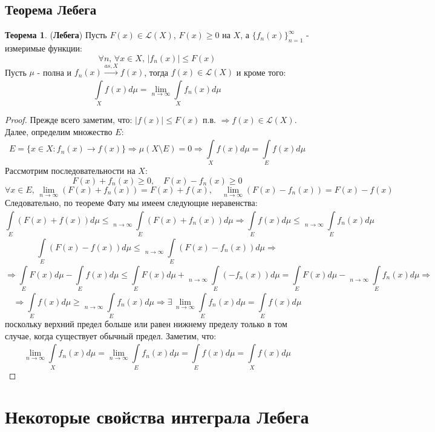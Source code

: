 \documentclass[12pt]{article}
\newcommand{\ML}{\mathcal{L}}
\theoremstyle{definition}
\newtheorem{theorem}{Теорема}
\newcommand{\ddint}[2]{\displaystyle\int\limits_{#1}^{#2}}
\DeclareMathOperator*\lowlim{\underline{lim}}
\DeclareMathOperator*\uplim{\overline{lim}}
\begin{document}
\subsection*{Теорема Лебега}
\begin{theorem}(\textbf{Лебега})
	Пусть $F(x) \in \ML(X)$, $F(x) \geq 0$ на $X$, а $\{f_n(x)\}_{n = 1}^{\infty}$ - измеримые функции:
	$$
		\forall n, \, \forall x \in X, \, |f_n(x)| \leq F(x)
	$$
	Пусть $\mu$ - полна и $f_n(x) \xrightarrow{as, X} f(x)$, тогда $f(x) \in \ML(X)$ и кроме того:
	$$
		\ddint{X}{}f(x)d\mu = \lim\limits_{n \to \infty}\ddint{X}{}f_n(x)d\mu
	$$
\end{theorem}
\begin{proof}
	Прежде всего заметим, что: $|f(x)| \leq F(x)$ п.в. $\Rightarrow f(x) \in \ML(X)$. Далее, определим множество $E$:
	$$
		E = \{x \in X \colon f_n(x) \to f(x)\} \Rightarrow \mu(X \setminus E) = 0 \Rightarrow \ddint{X}{}f(x)d\mu = \ddint{E}{}f(x)d\mu
	$$
	Рассмотрим последовательности на $X$:
	$$
		F(x) + f_n(x) \geq 0, \quad  F(x) - f_n(x) \geq 0 
	$$
	$$
		\forall x \in E,\, \lim\limits_{n \to \infty}(F(x) + f_n(x)) = F(x) + f(x), \quad \lim\limits_{n \to \infty}(F(x) - f_n(x)) = F(x) - f(x)
	$$
	Следовательно, по теореме Фату мы имеем следующие неравенства:
	$$
		\ddint{E}{}(F(x) + f(x))d\mu \leq \lowlim\limits_{n \to \infty}\ddint{E}{}(F(x) + f_n(x))d\mu \Rightarrow \ddint{E}{}f(x)d\mu \leq \lowlim\limits_{n \to \infty}\ddint{E}{}f_n(x)d\mu
	$$
	$$
		\ddint{E}{}(F(x) - f(x))d\mu \leq \lowlim\limits_{n \to \infty}\ddint{E}{}(F(x) - f_n(x))d\mu \Rightarrow 
	$$
	$$
		\Rightarrow  \ddint{E}{}F(x)d\mu - \ddint{E}{}f(x)d\mu \leq \ddint{E}{}F(x)d\mu + \lowlim\limits_{n \to \infty}\ddint{E}{}(-f_n(x))d\mu = \ddint{E}{}F(x)d\mu - \uplim\limits_{n \to \infty}\ddint{E}{}f_n(x)d\mu \Rightarrow
	$$
	$$
		\Rightarrow \ddint{E}{}f(x)d\mu \geq \uplim\limits_{n \to \infty}\ddint{E}{}f_n(x)d\mu \Rightarrow \exists \, \lim\limits_{n \to \infty}\ddint{E}{}f_n(x)d\mu = \ddint{E}{}f(x)d\mu
	$$
	поскольку верхний предел больше или равен нижнему пределу только в том случае, когда существует обычный предел. Заметим, что:
	$$
		\lim\limits_{n \to \infty}\ddint{X}{}f_n(x)d\mu = \lim\limits_{n \to \infty}\ddint{E}{}f_n(x)d\mu = \ddint{E}{}f(x)d\mu = \ddint{X}{}f(x)d\mu
	$$
\end{proof}

\section*{Некоторые свойства интеграла Лебега}
\end{document}
